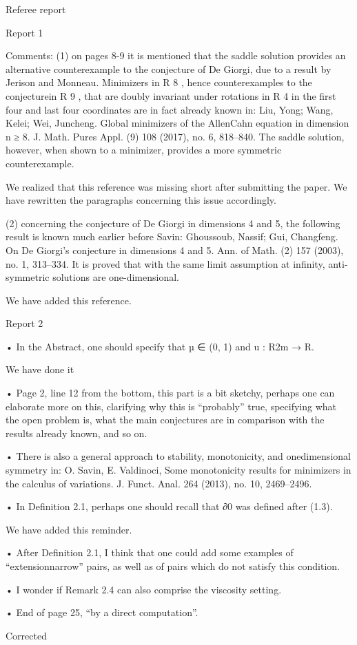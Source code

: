 Referee report


Report 1

Comments:
(1) on pages 8-9 it is mentioned that the saddle solution provides an alternative counterexample to the conjecture of De Giorgi, due to a result by Jerison and Monneau. Minimizers in R 8
, hence counterexamples to the conjecturein R 9
, that are doubly invariant under rotations in R 4 in the first four and
last four coordinates are in fact already known in:
Liu, Yong; Wang, Kelei; Wei, Juncheng. Global minimizers of the AllenCahn equation in dimension n ≥ 8. J. Math. Pures Appl. (9) 108 (2017),
no. 6, 818–840.
The saddle solution, however, when shown to a minimizer, provides a
more symmetric counterexample.


We realized that this reference was missing short after submitting the paper. We have rewritten the paragraphs concerning this issue accordingly.


(2) concerning the conjecture of De Giorgi in dimensions 4 and 5, the following
result is known much earlier before Savin:
Ghoussoub, Nassif; Gui, Changfeng. On De Giorgi’s conjecture in dimensions 4 and 5. Ann. of Math. (2) 157 (2003), no. 1, 313–334.
It is proved that with the same limit assumption at infinity, anti-symmetric
solutions are one-dimensional.



We have added this reference.


Report 2


• In the Abstract, one should specify that µ ∈ (0, 1) and u : R2m → R.

We have done it

• Page 2, line 12 from the bottom, this part is a bit sketchy, perhaps one can elaborate more on this, clarifying why this is “probably” true, specifying what the open problem is, what the main conjectures are in comparison with the results already known, and so on.


• There is also a general approach to stability, monotonicity, and onedimensional symmetry in: O. Savin, E. Valdinoci, Some monotonicity results for minimizers in the calculus of variations. J. Funct. Anal. 264 (2013), no. 10, 2469–2496.



• In Definition 2.1, perhaps one should recall that ∂0 was defined after (1.3).

We have added this reminder.


• After Definition 2.1, I think that one could add some examples of “extensionnarrow” pairs, as well as of pairs which do not satisfy this condition.



• I wonder if Remark 2.4 can also comprise the viscosity setting.


• End of page 25, “by a direct computation”.

Corrected

